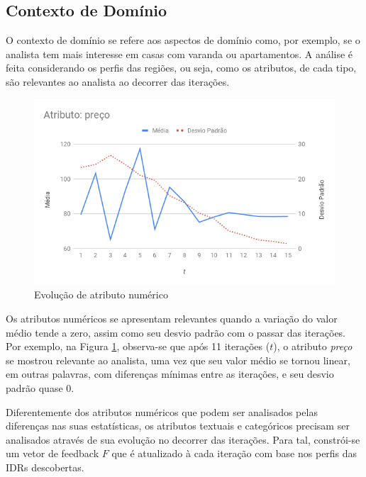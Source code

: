 
\subsection{Contexto de Domínio}

O contexto de domínio se refere aos aspectos de domínio como, por exemplo, se o analista tem mais interesse em casas com varanda ou apartamentos. A análise é feita considerando os perfis das regiões, ou seja, como os atributos, de cada tipo, são relevantes ao analista ao decorrer das iterações.

\begin{figure}[]
	\centering
	\includegraphics[width=\textwidth]{imagens/analise-atributo-numerico}
	\caption{Evolução de atributo numérico}
	\label{fig:analise-atributo-numerico}
\end{figure}

Os atributos numéricos se apresentam relevantes quando a variação do valor médio tende a zero, assim como seu desvio padrão com o passar das iterações. Por exemplo, na Figura \ref{fig:analise-atributo-numerico}, observa-se que após 11 iterações ($t$), o atributo {\em preço} se mostrou relevante ao analista, uma vez que seu valor médio se tornou linear, em outras palavras, com diferenças mínimas entre as iterações, e seu desvio padrão quase 0.


Diferentemente dos atributos numéricos que podem ser analisados pelas diferenças nas suas estatísticas, os atributos textuais e categóricos precisam ser analisados através de sua evolução no decorrer das iterações. Para tal, constrói-se um vetor de feedback $F$ que é atualizado à cada iteração com base nos perfis das IDRs descobertas.

